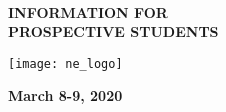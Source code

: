 
\begin{center}
\-\\
	\begin{spacing}{2.5}
	\textbf{\Huge INFORMATION FOR \\ PROSPECTIVE STUDENTS}
	\end{spacing}

	\vspace{1cm}

	\texttt{[image: ne\_logo]}

	\vspace{2cm}

	\textbf{\huge March 8-9, 2020}
\end{center}
